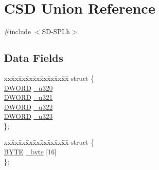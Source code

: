 \hypertarget{union_c_s_d}{}\section{C\+S\+D Union Reference}
\label{union_c_s_d}


{\ttfamily \#include $<$S\+D-\/\+S\+P\+I.\+h$>$}

\subsection*{Data Fields}
\begin{DoxyCompactItemize}
\item 
\begin{tabbing}
xx\=xx\=xx\=xx\=xx\=xx\=xx\=xx\=xx\=\kill
struct \{\\
\>\hyperlink{_generic_type_defs_8h_ad342ac907eb044443153a22f964bf0af}{DWORD} \hyperlink{union_c_s_d_a446384ca0781a9e9ed10e276b4a58701}{\_u320}\\
\>\hyperlink{_generic_type_defs_8h_ad342ac907eb044443153a22f964bf0af}{DWORD} \hyperlink{union_c_s_d_afcfcec75ab1ad51ac055518c4e4481b1}{\_u321}\\
\>\hyperlink{_generic_type_defs_8h_ad342ac907eb044443153a22f964bf0af}{DWORD} \hyperlink{union_c_s_d_a35670bdcd4d10351e71df6cd3d3ac95b}{\_u322}\\
\>\hyperlink{_generic_type_defs_8h_ad342ac907eb044443153a22f964bf0af}{DWORD} \hyperlink{union_c_s_d_a48410d35cd59cf3964706daf7c80d8fa}{\_u323}\\
\}; \\

\end{tabbing}\item 
\begin{tabbing}
xx\=xx\=xx\=xx\=xx\=xx\=xx\=xx\=xx\=\kill
struct \{\\
\>\hyperlink{_generic_type_defs_8h_a4ae1dab0fb4b072a66584546209e7d58}{BYTE} \hyperlink{union_c_s_d_a89bb97022529d46ff9cac7274a7b9faa}{\_byte} \mbox{[}16\mbox{]}\\
\}; \\


\end{tabbing}
\end{DoxyCompactItemize}

